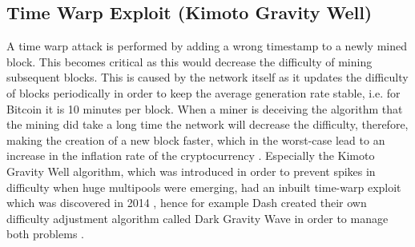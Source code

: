 \documentclass[a4paper,12pt]{report}
\begin{document}
	    \subsection{Time Warp Exploit (Kimoto Gravity Well)}
	    \startsubsection
	        A time warp attack is performed by adding a wrong timestamp to a newly mined block. This becomes critical as this would decrease the difficulty of mining subsequent blocks. This is caused by the network itself as it updates the difficulty of blocks periodically in order to keep the average generation rate stable, i.e. for Bitcoin it is 10 minutes per block. When a miner is deceiving the algorithm that the mining did take a long time the network will decrease the difficulty, therefore, making the creation of a new block faster, which in the worst-case lead to an increase in the inflation rate of the cryptocurrency \parencite{TimeWarpAttack}. Especially the Kimoto Gravity Well algorithm, which was introduced in order to prevent spikes in difficulty when huge multipools were emerging, had an inbuilt time-warp exploit which was discovered in 2014 \parencite{TimeWarpExploitKGWForum}, hence for example Dash created their own difficulty adjustment algorithm called Dark Gravity Wave in order to manage both problems \parencite{DashDAODocs}.
	    \closesection
\end{document}

